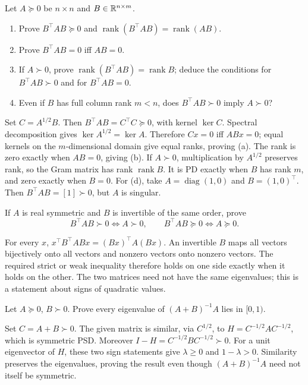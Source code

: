 \begin{problem}\label{ex:09:matrix-forms}
Let \(A\succeq0\) be \(n\times n\) and \(B\in\mathbb R^{n\times m}\).
\begin{enumerate}
\item Prove \(B^\top AB\succeq0\) and
\(\operatorname{rank}(B^\top AB)=\operatorname{rank}(AB)\).
\item Prove \(B^\top AB=0\) iff \(AB=0\).
\item If \(A\succ0\), prove
\(\operatorname{rank}(B^\top AB)=\operatorname{rank}B\);
deduce the conditions for \(B^\top AB\succ0\) and for \(B^\top AB=0\).
\item Even if \(B\) has full column rank \(m<n\), does
\(B^\top AB\succ0\) imply \(A\succ0\)?
\end{enumerate}
\end{problem}
\begin{solution}
Set \(C=A^{1/2}B\). Then \(B^\top AB=C^\top C\succeq0\), with
kernel \(\ker C\).
Spectral decomposition gives \(\ker A^{1/2}=\ker A\).
Therefore \(Cx=0\) iff \(ABx=0\); equal kernels on the \(m\)-dimensional
domain give equal ranks, proving (a). The rank is zero exactly when
\(AB=0\), giving (b).
If \(A\succ0\), multiplication by \(A^{1/2}\) preserves rank, so
the Gram matrix has rank \(\operatorname{rank}B\).
It is PD exactly when \(B\) has rank \(m\), and zero exactly when \(B=0\).
For (d), take \(A=\operatorname{diag}(1,0)\) and \(B=(1,0)^\top\).
Then \(B^\top AB=[1]\succ0\), but \(A\) is singular.
\end{solution}

\begin{problem}\label{ex:09:congruence}
If \(A\) is real symmetric and \(B\) is invertible of the same order,
prove
\[
 B^\top AB\succ0\iff A\succ0,\qquad
 B^\top AB\succeq0\iff A\succeq0.
\]
\end{problem}
\begin{solution}
For every \(x\),
\(x^\top B^\top ABx=(Bx)^\top A(Bx)\).
An invertible \(B\) maps all vectors bijectively onto all vectors and
nonzero vectors onto nonzero vectors. The required strict or weak
inequality therefore holds on one side exactly when it holds on the
other. The two matrices need not have the same eigenvalues; this is
a statement about signs of quadratic values.
\end{solution}

\begin{problem}\label{ex:09:shrinkage}
Let \(A\succeq0\), \(B\succ0\). Prove every eigenvalue of
\((A+B)^{-1}A\) lies in \([0,1)\).
\end{problem}
\begin{solution}
Set \(C=A+B\succ0\).
The given matrix is similar, via \(C^{1/2}\), to
\(H=C^{-1/2}AC^{-1/2}\), which is symmetric PSD.
Moreover
\(I-H=C^{-1/2}BC^{-1/2}\succ0\).
For a unit eigenvector of \(H\), these two sign statements give
\(\lambda\geqslant0\) and \(1-\lambda>0\).
Similarity preserves the eigenvalues, proving the result even though
\((A+B)^{-1}A\) need not itself be symmetric.
\end{solution}

